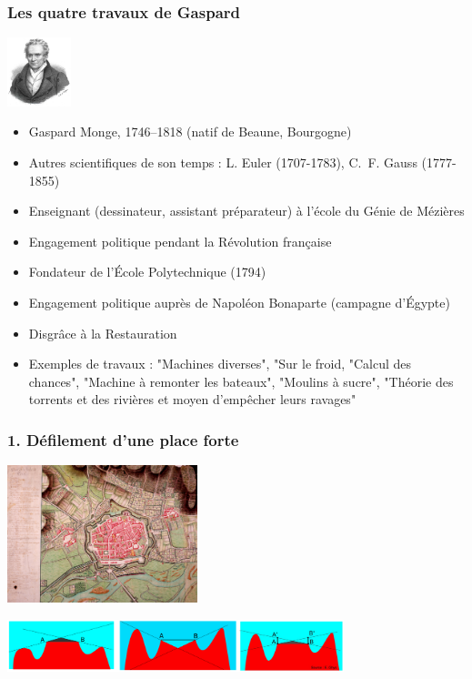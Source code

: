 \documentclass[9pt]{beamer}
\begin{document}
\begin{frame}
\frametitle{\bf Les quatre travaux de Gaspard}

\centering \includegraphics[height=2.0cm]{monge}

\begin{itemize}
  \item Gaspard Monge, 1746--1818 (natif de Beaune, Bourgogne)
  \item Autres scientifiques de son temps : L. Euler (1707-1783), C.~F. Gauss (1777-1855)
  \item Enseignant (dessinateur, assistant pr\'eparateur) \`a l'\'ecole du G\'enie de M\'ezi\`eres
  \item Engagement politique pendant la R\'evolution fran\c caise
  \item Fondateur de l'\'Ecole Polytechnique (1794)
  \item Engagement politique aupr\`es de Napol\'eon Bonaparte (campagne d'\'Egypte)
  \item Disgr\^ace \`a la Restauration
  \item Exemples de travaux : "Machines diverses", "Sur le froid, "Calcul des chances", "Machine \`a remonter les bateaux", "Moulins \`a sucre", "Th\'eorie des torrents et des rivi\`eres et moyen d'emp\^echer leurs ravages"
\end{itemize}
 
\end{frame}

\begin{frame}
\frametitle{\bf 1. D\'efilement d'une place forte}
 
\centering \includegraphics[height=4.0cm]{defil1}

\centering \includegraphics[height=1.5cm]{defil2}

\end{frame}
\end{document}
